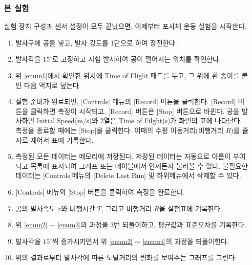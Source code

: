 \documentclass[12pt,a4paper]{article}
\begin{document}
\subsubsection{본 실험}
실험 장치 구성과 센서 설정이 모두 끝났으면, 이제부터 포사체 운동 실험을 시작한다.
\begin{enumerate}
    \item {\label{enum2}발사구에 공을 넣고, 발사 강도를 1단으로 하여 장전한다.}
    \item {\label{enum1}발사각을 $15^{\circ}$로 고정하고 시험 발사하여 공이 떨어지는 위치를 확인한다.}
    \item 위 \ref{enum1}에서 확인한 위치에 Time of Flight 패드를 두고, 그 위에 흰 종이를 붙인 다음 먹지로 덮는다.
    \item 실험 준비가 완료되면, [Controls] 메뉴의 [Record] 버튼을 클릭한다. [Record] 버튼을 클릭하면 측정이 시작되고,
    [Record] 버튼은 [Stop] 버튼으로 바뀐다. 공을 발사하면 Initial Speed(m/s)와 2열은 Time of Filght(s)가 화면의
    표에 나타난다. 측정을 종료할 때에는 [Stop]을 클릭한다. 이때의 수평 이동거리(비행거리 $R$)를 줄자로 재어서 표에
    기록한다.
    \item 측정된 모든 데이터는 메모리에 저장된다. 저장된 데이터는 자동으로 이름이 부여되고 목록에 표시되여 그래프 또는
    테이블에서 언제든지 불러올 수 있다. 불필요한 데이터는 [Controls]메뉴의 [Delete Last Run] 및 하위메뉴에서 삭제할 수
    있다.
    \item {[Controls]} 메뉴의 [Stop] 버튼을 클릭하여 측정을 완료한다.
    \item {\label{enum3}공의 발사속도 $v$와 비행시간 $T$, 그리고 비행거리 $R$을 실험표에 기록한다.}
    \item {\label{enum4}위 \ref{enum2} $\sim$ \ref{enum3}의 과정을 3번 되풀이하고, 평균값과 표준오차를 기록한다.}
    \item 발사각을 $15^{\circ}$씩 증가시키면서 위 \ref{enum2} $\sim$ \ref{enum4}의 과정을 되풀이한다.
    \item 위의 결과로부터 발사각에 따른 도달거리의 변화를 보여주는 그래프를 그린다.
\end{enumerate}
\end{document}
